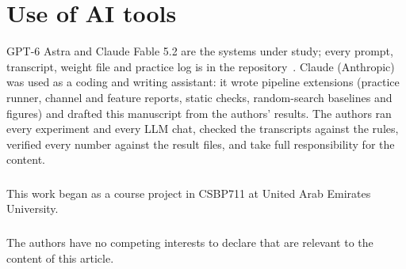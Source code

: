 \documentclass[runningheads]{llncs}
\newcommand{\Astra}{GPT-6 Astra}
\begin{document}
\section*{Use of AI tools}
\Astra{} and Claude Fable 5.2 are the systems under study; every prompt, transcript, weight file and practice log is in the repository~\cite{repo}.
Claude (Anthropic) was used as a coding and writing assistant: it wrote pipeline extensions (practice runner, channel and feature reports, static checks, random-search baselines and figures) and drafted this manuscript from the authors' results.
The authors ran every experiment and every LLM chat, checked the transcripts against the rules, verified every number against the result files, and take full responsibility for the content.

\begin{credits}
\subsubsection{\ackname}
This work began as a course project in CSBP711 at United Arab Emirates University.

\subsubsection{\discintname}
The authors have no competing interests to declare that are relevant to the content of this article.
\end{credits}



\end{document}
